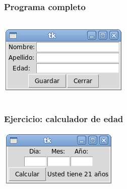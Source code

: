 \documentclass[12pt]{beamer}
\begin{document}
  \begin{frame}
    \label{programa-marcos}
    \frametitle{Programa completo}
    \begin{columns}[B]
        \tiny
        
        \vspace{24ex}
        \includegraphics[width=\textwidth]{programas/tkinter/capturas/13.png}
    \end{columns}
  \end{frame}

  \begin{frame}
    \label{ejercicio-tabla}
    \frametitle{Ejercicio: calculador de edad}
    \begin{center}
      \includegraphics[width=.8\textwidth]{programas/tkinter/capturas/14.png}
    \end{center}
  \end{frame}
\end{document}
